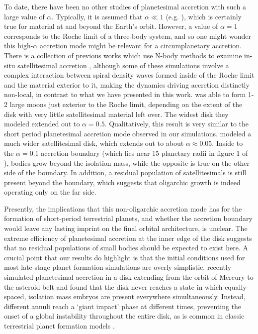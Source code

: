 \documentclass[twocolumn,linenumbers]{aastex63}
\begin{document}
To date, there have been no other studies of planetesimal accretion
with such a large value of $\alpha$. Typically, it is assumed that $\alpha \ll 1$ (e.g. \citet{lithwick14}), which is certainly true for material at and beyond the Earth's orbit. However, a value of $\alpha = 1$
corresponds to the Roche limit of a three-body system, and so one
might wonder this high-$\alpha$ accretion mode might be relevant for a
circumplanetary accretion. There is a collection of previous works
which use N-body methods to examine in-situ satellitesimal accretion
\citep{ida97, richardson00, kokubo00b, ida20}, although some of these simulations involve a complex interaction between spiral 
density waves formed inside of the Roche limit and the material exterior to it, making the dynamics driving accretion distinctly non-local, in contrast to what we have presented in this work. \citet{ida97} was able to form 1-2
large moons just exterior to the Roche limit, depending on the extent of the disk with very little satellitesimal material left over. 
The widest disk they modeled extended out to $\alpha = 0.5$. Qualitatively, this result is very similar to the short period 
planetesimal accretion mode observed in our simulations. \citet{ida20} modeled a much wider satellitesimal disk, which extends 
out to about $\alpha \approx 0.05$. Inside to the $\alpha = 0.1$ accretion boundary (which lies near 15 planetary radii in figure 1 of 
\citet{ida20}), bodies grow beyond the isolation mass, while the opposite is true on the other side of the boundary. In addition, a 
residual population of satellitesimals is still present beyond the boundary, which suggests that oligarchic growth is indeed 
operating only on the far side.

Presently, the implications that this non-oligarchic accretion mode has for the formation of short-period terrestrial planets, and 
whether the accretion boundary would leave any lasting imprint on the final orbital architecture, is unclear. The extreme efficiency of planetesimal accretion at the inner edge of the disk suggests that no residual populations of small bodies should be expected to exist here. A crucial point that our 
results do highlight is that the initial conditions used for most late-stage planet formation simulations are overly simplistic. 
\citet{clement20} recently simulated planetesimal accretion in a disk extending from the orbit of Mercury to the asteroid belt and 
found that the disk never reaches a state in which equally-spaced, isolation mass embryos are present everywhere 
simultaneously. Instead, different annuli reach a `giant impact' phase at different times, preventing the onset of a global instability 
throughout the entire disk, as is common in classic terrestrial planet formation models \citep{chambers01, raymond09}.
\end{document}
